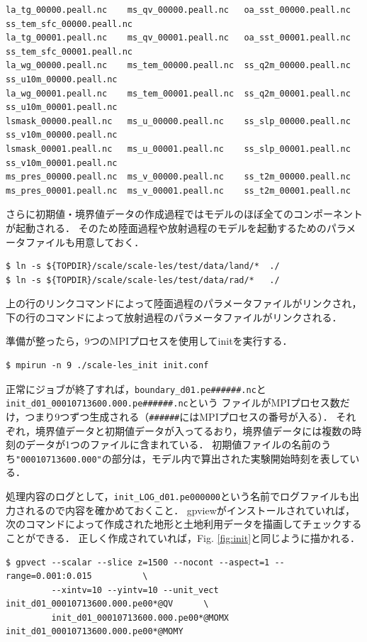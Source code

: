 {\small \begin{verbatim}
la_tg_00000.peall.nc    ms_qv_00000.peall.nc   oa_sst_00000.peall.nc  ss_tem_sfc_00000.peall.nc
la_tg_00001.peall.nc    ms_qv_00001.peall.nc   oa_sst_00001.peall.nc  ss_tem_sfc_00001.peall.nc
la_wg_00000.peall.nc    ms_tem_00000.peall.nc  ss_q2m_00000.peall.nc  ss_u10m_00000.peall.nc
la_wg_00001.peall.nc    ms_tem_00001.peall.nc  ss_q2m_00001.peall.nc  ss_u10m_00001.peall.nc
lsmask_00000.peall.nc   ms_u_00000.peall.nc    ss_slp_00000.peall.nc  ss_v10m_00000.peall.nc
lsmask_00001.peall.nc   ms_u_00001.peall.nc    ss_slp_00001.peall.nc  ss_v10m_00001.peall.nc
ms_pres_00000.peall.nc  ms_v_00000.peall.nc    ss_t2m_00000.peall.nc
ms_pres_00001.peall.nc  ms_v_00001.peall.nc    ss_t2m_00001.peall.nc
\end{verbatim} }

さらに初期値・境界値データの作成過程ではモデルのほぼ全てのコンポーネントが起動される．
そのため陸面過程や放射過程のモデルを起動するためのパラメータファイルも用意しておく．

\begin{verbatim}
$ ln -s ${TOPDIR}/scale/scale-les/test/data/land/*  ./
$ ln -s ${TOPDIR}/scale/scale-les/test/data/rad/*   ./
\end{verbatim}
上の行のリンクコマンドによって陸面過程のパラメータファイルがリンクされ，
下の行のコマンドによって放射過程のパラメータファイルがリンクされる．


準備が整ったら，9つのMPIプロセスを使用してinitを実行する．
\begin{verbatim}
$ mpirun -n 9 ./scale-les_init init.conf
\end{verbatim}

正常にジョブが終了すれば，\verb|boundary_d01.pe######.nc|と\verb|init_d01_00010713600.000.pe######.nc|という
ファイルがMPIプロセス数だけ，つまり9つずつ生成される（\verb|######|にはMPIプロセスの番号が入る）．
それぞれ，境界値データと初期値データが入ってるおり，境界値データには複数の時刻のデータが1つのファイルに含まれている．
初期値ファイルの名前のうち\verb|"00010713600.000"|の部分は，モデル内で算出された実験開始時刻を表している．

処理内容のログとして，\verb|init_LOG_d01.pe000000|という名前でログファイルも出力されるので内容を確かめておくこと．
gpviewがインストールされていれば，次のコマンドによって作成された地形と土地利用データを描画してチェックすることができる．
正しく作成されていれば，Fig. \ref{fig:init}と同じように描かれる．

\begin{verbatim}
$ gpvect --scalar --slice z=1500 --nocont --aspect=1 --range=0.001:0.015          \
         --xintv=10 --yintv=10 --unit_vect init_d01_00010713600.000.pe00*@QV      \
         init_d01_00010713600.000.pe00*@MOMX init_d01_00010713600.000.pe00*@MOMY
\end{verbatim}


